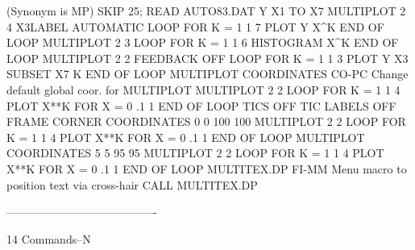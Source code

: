                                   (Synonym is MP)
                                  SKIP 25; READ AUTO83.DAT Y X1 TO X7
                                  MULTIPLOT 2 4
                                  X3LABEL AUTOMATIC
                                  LOOP FOR K = 1 1 7
                                  PLOT Y X^K
                                  END OF LOOP
                                  MULTIPLOT 2 3
                                  LOOP FOR K = 1 1 6
                                  HISTOGRAM X^K
                                  END OF LOOP
                                  MULTIPLOT 2 2
                                  FEEDBACK OFF
                                  LOOP FOR K = 1 1 3
                                  PLOT Y X3 SUBSET X7 K
                                  END OF LOOP
MULTIPLOT COORDINATES       CO-PC Change default global coor. for MULTIPLOT
                                  MULTIPLOT 2 2
                                  LOOP FOR K = 1 1 4
                                  PLOT X**K FOR X = 0 .1 1
                                  END OF LOOP
                                  TICS OFF
                                  TIC LABELS OFF
                                  FRAME CORNER COORDINATES 0 0 100 100
                                  MULTIPLOT 2 2
                                  LOOP FOR K = 1 1 4
                                  PLOT X**K FOR X = 0 .1 1
                                  END OF LOOP
                                  MULTIPLOT COORDINATES 5 5 95 95
                                  MULTIPLOT 2 2
                                  LOOP FOR K = 1 1 4
                                  PLOT X**K FOR X = 0 .1 1
                                  END OF LOOP
MULTITEX.DP                 FI-MM Menu macro to position text via cross-hair
                                  CALL MULTITEX.DP
 
----------------------------------------
 
14
Commands--N
 
